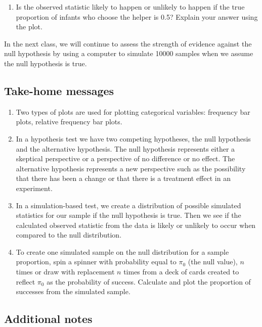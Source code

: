 \documentclass[
]{report}
\providecommand{\tightlist}{%
  \setlength{\itemsep}{0pt}\setlength{\parskip}{0pt}}
\begin{document}
\begin{enumerate}
\def\labelenumi{\arabic{enumi}.}
\setcounter{enumi}{9}
\tightlist
\item
  Is the observed statistic likely to happen or unlikely to happen if the true proportion of infants who choose the helper is 0.5? Explain your answer using the plot.
\end{enumerate}

\vspace{0.8in}

In the next class, we will continue to assess the strength of evidence against the null hypothesis by using a computer to simulate 10000 samples when we assume the null hypothesis is true.

\subsection{Take-home messages}\label{take-home-messages-3}

\begin{enumerate}
\def\labelenumi{\arabic{enumi}.}
\item
  Two types of plots are used for plotting categorical variables: frequency bar plots, relative frequency bar plots.
\item
  In a hypothesis test we have two competing hypotheses, the null hypothesis and the alternative hypothesis. The null hypothesis represents either a skeptical perspective or a perspective of no difference or no effect. The alternative hypothesis represents a new perspective such as the possibility that there has been a change or that there is a treatment effect in an experiment.
\item
  In a simulation-based test, we create a distribution of possible simulated statistics for our sample if the null hypothesis is true. Then we see if the calculated observed statistic from the data is likely or unlikely to occur when compared to the null distribution.
\item
  To create one simulated sample on the null distribution for a sample proportion, spin a spinner with probability equal to \(\pi_0\) (the null value), \(n\) times or draw with replacement \(n\) times from a deck of cards created to reflect \(\pi_0\) as the probability of success. Calculate and plot the proportion of successes from the simulated sample.
\end{enumerate}

\subsection{Additional notes}\label{additional-notes-3}
\end{document}
